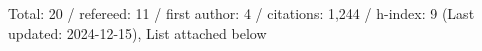 Total: 20 / refereed: 11 / first author: 4 / citations: 1,244 / h-index: 9 (Last updated: 2024-12-15), List attached below
